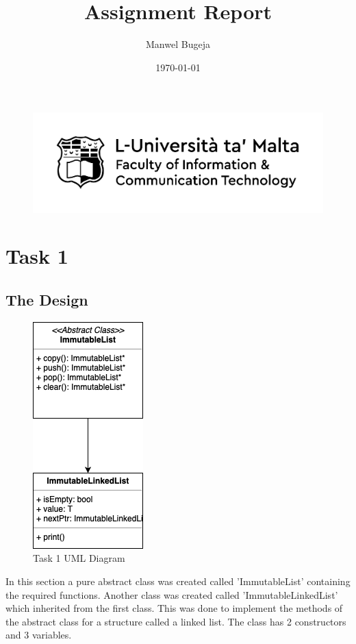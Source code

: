 \documentclass[a4paper, 12pt]{report}
\begin{document}
\begin{figure}[H]
    \centering
    \includegraphics[width=1\textwidth]{Logo}
\end{figure}

\title{Assignment Report}
\author{Manwel Bugeja}
\date{\today}
\maketitle

\tableofcontents
\newpage

\section{Task 1}

\subsection{The Design}

\begin{figure}[H]
    \centering
    \includegraphics{"UML 1"}
    \caption{Task 1 UML Diagram}
\end{figure}

In this section a pure abstract class was created called 'ImmutableList' containing the required functions.  Another class was created called 'ImmutableLinkedList' which inherited from the first class. This was done to implement the methods of the abstract class for a structure called a linked list. The class has 2 constructors and 3 variables.
\end{document}

